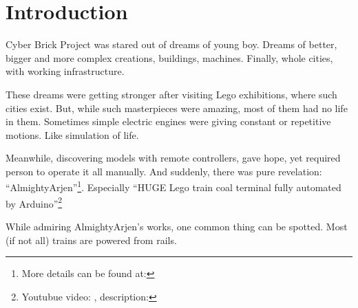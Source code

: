 \section{Introduction}

Cyber Brick Project was stared out of dreams of young boy. Dreams of better, bigger and more
complex creations, buildings, machines. Finally, whole cities, with working infrastructure.

These dreams were getting stronger after visiting Lego exhibitions, where such cities exist. But,
while such masterpieces were amazing, most of them had no life in them. Sometimes simple electric
engines were giving constant or repetitive motions. Like simulation of life.

Meanwhile, discovering models with remote controllers, gave hope, yet required person to
operate it all manually. And suddenly, there was pure revelation: ``AlmightyArjen''\footnote{
More details can be found at: }. Especially ``HUGE Lego train
coal terminal fully automated by Arduino''\footnote{ Youtubue video:
, description: }

While admiring AlmightyArjen's works, one common thing can be spotted. Most (if not all) trains
are powered from rails.


